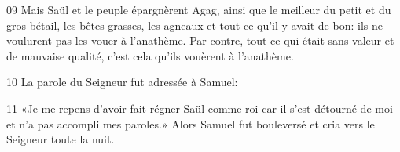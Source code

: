 
09 Mais Saül et le peuple épargnèrent Agag, ainsi que le meilleur du petit et du gros bétail, les bêtes grasses, les agneaux et tout ce qu’il y avait de bon: ils ne voulurent pas les vouer à l’anathème. Par contre, tout ce qui était sans valeur et de mauvaise qualité, c’est cela qu’ils vouèrent à l’anathème.

10 La parole du Seigneur fut adressée à Samuel:

11 «Je me repens d’avoir fait régner Saül comme roi car il s’est détourné de moi et n’a pas accompli mes paroles.» Alors Samuel fut bouleversé et cria vers le Seigneur toute la nuit.
